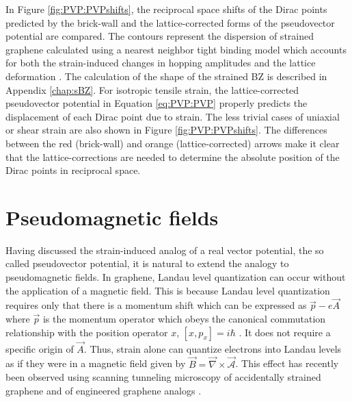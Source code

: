 In Figure \ref{fig:PVP:PVPshifts}, the reciprocal space shifts of the Dirac points predicted by the brick-wall and the lattice-corrected forms of the pseudovector potential are compared.
The contours represent the dispersion of strained graphene calculated using a nearest neighbor tight binding model which accounts for both the strain-induced changes in hopping amplitudes and the lattice deformation \cite{Pereira2009}.
The calculation of the shape of the strained BZ is described in Appendix \ref{chap:sBZ}.
For isotropic tensile strain, the lattice-corrected pseudovector potential in Equation \ref{eq:PVP:PVP} properly predicts the displacement of each Dirac point due to strain.
The less trivial cases of uniaxial or shear strain are also shown in Figure \ref{fig:PVP:PVPshifts}.
The differences between the red (brick-wall) and orange (lattice-corrected) arrows make it clear that the lattice-corrections are needed to determine the absolute position of the Dirac points in reciprocal space.

\section{Pseudomagnetic fields}
Having discussed the strain-induced analog of a real vector potential, the so called pseudovector potential, it is natural to extend the analogy to pseudomagnetic fields.
In graphene, Landau level quantization can occur without the application of a magnetic field.
This is because Landau level quantization requires only that there is a momentum shift which can be expressed as $\vec{p}-e\vec{A}$ where $\vec{p}$ is the momentum operator which obeys the canonical commutation relationship with the position operator $x$, $[x,p_x]=i \hbar$ \cite{Goerbig2011}.
It does not require a specific origin of $\vec{A}$.
Thus, strain alone can quantize electrons into Landau levels as if they were in a magnetic field given by $\vec{B}=\vec{\nabla}\times\vec{\mathcal{A}}$.
This effect has recently been observed using scanning tunneling microscopy of accidentally strained graphene \cite{Levy2010,Yan2012,Yeh2011} and of engineered graphene analogs \cite{Gomes2012}.

